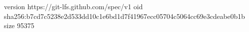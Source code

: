version https://git-lfs.github.com/spec/v1
oid sha256:b7cd7c5238e2d533dd10c1e6bd1d7f41967ecc05704c5064cc69e3cdeabe0b1b
size 95375
